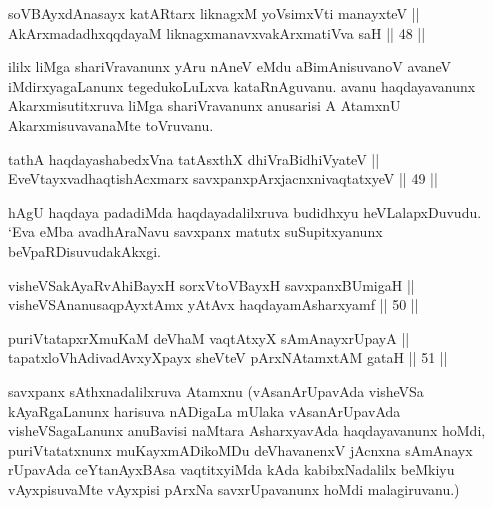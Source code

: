 
\begin{shl}
soV\s BAyxdAnasayx katAR\s tarx liknagxM yoV\s simxVti manayxteV || \\
AkArxmadadhxqqdayaM liknagxmanavxvakArxmatiVva saH \hfill || 48 ||  
\end{shl}

\begin{artha}
ililx liMga shariVravanunx yAru nAneV eMdu aBimAnisuvanoV avaneV
iMdirxyagaLanunx tegedukoLuLxva kataRnAguvanu. avanu haqdayavanunx
Akarxmisutitxruva liMga shariVravanunx anusarisi A AtamxnU
AkarxmisuvavanaMte toVruvanu.
\end{artha}


\begin{shl}
tathA haqdayashabedxVna tatAsxthX dhiVraBidhiVyateV || \\
EveVtayxvadhaqtishAcxmarx savxpanx\footnotemark[1]pArxjacnxnivaqtatxyeV \hfill || 49 ||  
\end{shl}

\begin{artha}
hAgU haqdaya padadiMda haqdayadalilxruva budidhxyu heVLalapxDuvudu. `Eva eMba avadhAraNavu savxpanx matutx suSupitxyanunx beVpaRDisuvudakAkxgi.
\end{artha}


\begin{shl}
visheVSakAyaRvAhiBayxH sorxVtoVBayxH savxpanxBUmigaH || \\
visheVSAnanusaqpAyx\s \s tAmx yAtAvx haqdayamAsharxyamf \hfill || 50 || 
\end{shl}

\begin{shl}
puriVtatapxrXmuKaM deVhaM vaqtAtxyX sAmAnayxrUpayA || \\
tapatxloVhAdivadAvxyXpayx sheVteV pArxNAtamxtAM gataH \hfill || 51 ||  
\end{shl}

\begin{artha}
savxpanx sAthxnadalilxruva Atamxnu (vAsanArUpavAda visheVSa
kAyaRgaLanunx harisuva nADigaLa mUlaka vAsanArUpavAda visheVSagaLanunx
anuBavisi naMtara AsharxyavAda haqdayavanunx hoMdi, puriVtatatxnunx
muKayxmADikoMDu deVhavanenxV jAcnxna sAmAnayx rUpavAda ceYtanAyxBAsa
vaqtitxyiMda kAda kabibxNadalilx beMkiyu vAyxpisuvaMte vAyxpisi pArxNa
savxrUpavanunx hoMdi malagiruvanu.)
\end{artha}

